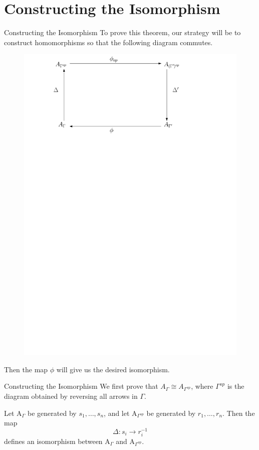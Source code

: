\documentclass{beamer}
\begin{document}
\section{Constructing the Isomorphism}

\begin{frame}{Constructing the Isomorphism}
To prove this theorem, our strategy will be to construct homomorphisms so that the following diagram commutes.
\begin{figure}
\includegraphics[scale = .50]{Comm-Diag.pdf}
\end{figure}
Then the map $\phi$ will give us the desired isomorphism.
\end{frame}

\begin{frame}{Constructing the Isomorphism}
We first prove that $A_{\Gamma} \cong A_{\Gamma^{op}}$, where $\Gamma^{op}$ is the diagram obtained by reversing all arrows in $\Gamma$.
\begin{lemma}
Let A$_{\Gamma}$ be generated by $s_{1}, \dots, s_{n}$, and let A$_{\Gamma^{op}}$ be generated by $r_{1}, \dots, r_{n}$. Then the map $$\Delta: s_{i} \rightarrow r_{i}^{-1}$$ defines an isomorphism between A$_{\Gamma}$ and A$_{\Gamma^{op}}.$
\end{lemma}
\end{frame}
\end{document}
